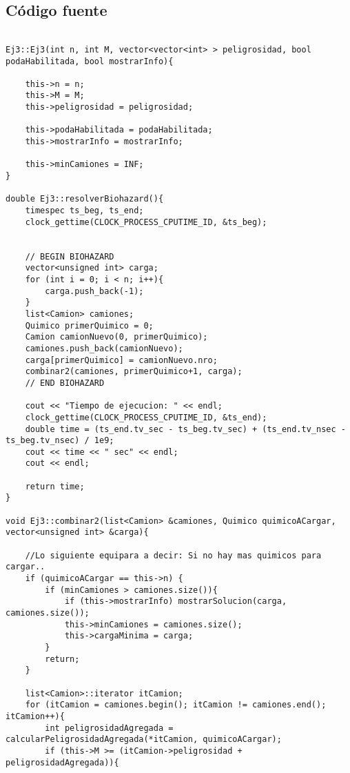 \subsection{C\'odigo fuente}

\begin{lstlisting}

Ej3::Ej3(int n, int M, vector<vector<int> > peligrosidad, bool podaHabilitada, bool mostrarInfo){

	this->n = n;
	this->M = M;
	this->peligrosidad = peligrosidad;

	this->podaHabilitada = podaHabilitada;
	this->mostrarInfo = mostrarInfo;

	this->minCamiones = INF;
}

double Ej3::resolverBiohazard(){
	timespec ts_beg, ts_end;
	clock_gettime(CLOCK_PROCESS_CPUTIME_ID, &ts_beg);


	// BEGIN BIOHAZARD
	vector<unsigned int> carga;
	for (int i = 0; i < n; i++){
		carga.push_back(-1);
	} 
	list<Camion> camiones;
	Quimico primerQuimico = 0;
	Camion camionNuevo(0, primerQuimico);
	camiones.push_back(camionNuevo);
	carga[primerQuimico] = camionNuevo.nro;
	combinar2(camiones, primerQuimico+1, carga);
	// END BIOHAZARD

	cout << "Tiempo de ejecucion: " << endl;
	clock_gettime(CLOCK_PROCESS_CPUTIME_ID, &ts_end);
	double time = (ts_end.tv_sec - ts_beg.tv_sec) + (ts_end.tv_nsec - ts_beg.tv_nsec) / 1e9;
	cout << time << " sec" << endl;
	cout << endl;

	return time;
}

void Ej3::combinar2(list<Camion> &camiones, Quimico quimicoACargar, vector<unsigned int> &carga){

	//Lo siguiente equipara a decir: Si no hay mas quimicos para cargar..
	if (quimicoACargar == this->n) {
		if (minCamiones > camiones.size()){
			if (this->mostrarInfo) mostrarSolucion(carga, camiones.size());
			this->minCamiones = camiones.size();
			this->cargaMinima = carga;	
		}
		return;
	}

	list<Camion>::iterator itCamion;
	for (itCamion = camiones.begin(); itCamion != camiones.end(); itCamion++){
		int peligrosidadAgregada = calcularPeligrosidadAgregada(*itCamion, quimicoACargar);
		if (this->M >= (itCamion->peligrosidad + peligrosidadAgregada)){


\end{lstlisting}

